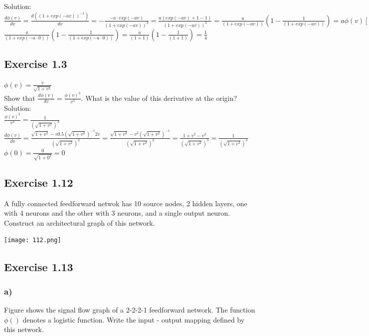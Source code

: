 \documentclass[a4paper, 12pt]{article}
\begin{document}
Solution:\\

$\frac{d\phi(v)}{dv} = \frac{d((1 + exp(-av))^{-1})}{dv} = -\frac{-a\cdot exp(-av)}{(1 + exp(-av))^2} = \frac{a(exp(-av) + 1 -1)}{(1 + exp(-av))^2} = \frac{a}{(1 + exp(-av))} (1 - \frac{1}{(1 + exp(-av))}) = a\phi(v)[1 - \phi(v)]$\\

$\frac{a}{(1 + exp(-a\cdot 0))} (1 - \frac{1}{(1 + exp(-a\cdot 0))}) = \frac{a}{(1 + 1)} (1 - \frac{1}{(1 + 1)}) = \frac{1}{4}$


\subsection{Exercise 1.3}

$\phi(v) = \frac{v}{\sqrt{1+v^2}}$\\


Show that $\frac{d\phi(v)}{dv} = \frac{\phi(v)^3}{v^3}$. What is the value of this derivative at the origin?\\

Solution:\\

$\frac{\phi(v)^3}{v^3} =\frac{1}{(\sqrt{1+v^2})^3} $\\

$\frac{d\phi(v)}{dv} = \frac{\sqrt{1+v^2}-v 0.5(\sqrt{1+v^2})^{-1}2v}{(\sqrt{1+v^2})^2} = \frac{\sqrt{1+v^2}-v^2 (\sqrt{1+v^2})^{-1}}{(\sqrt{1+v^2})^2} = \frac{1+v^2-v^2}{(\sqrt{1+v^2})^3}=\frac{1}{(\sqrt{1+v^2})^3} $\\

$\phi(0) = \frac{0}{\sqrt{1+0^2}} = 0$\\


\subsection{Exercise 1.12}

A fully connected feedforward netwok has 10 source nodes, 2 hidden layers, one with 4 neurons and the other with 3 neurons, and a single output neuron. Construct an architectural graph of this network.

\texttt{[image: 112.png]}


\subsection{Exercise 1.13}
\subsubsection{a)}
Figure shows the signal flow graph of a 2-2-2-1 feedforward network. The function $\phi()$ denotes a logistic function. Write the input - output mapping defined by this network.
\end{document}
